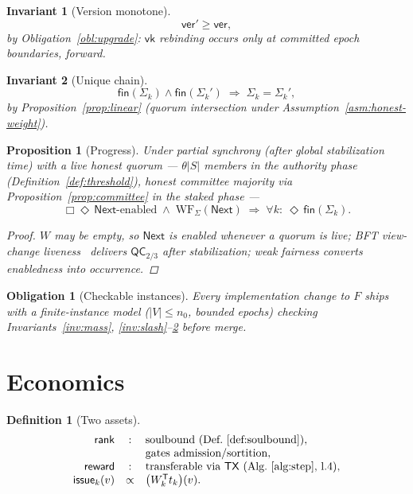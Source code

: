 \documentclass[11pt,letterpaper]{article}
\newtheorem{definition}{Definition}
\newtheorem{invariant}{Invariant}
\newtheorem{proposition}{Proposition}
\newtheorem{obligation}{Obligation}
\begin{document}
\begin{invariant}[Version monotone]\label{inv:version}
\[
\mathsf{ver}'\geq\mathsf{ver},
\]
by Obligation~\ref{obl:upgrade}: $\mathsf{vk}$ rebinding occurs only at
committed epoch boundaries, forward.
\end{invariant}

\begin{invariant}[Unique chain]\label{inv:unique}
\[
\mathsf{fin}(\Sigma_k)\land\mathsf{fin}(\Sigma_k')
\;\Rightarrow\;
\Sigma_k=\Sigma_k',
\]
by Proposition~\ref{prop:linear} (quorum intersection under
Assumption~\ref{asm:honest-weight}).
\end{invariant}

\begin{proposition}[Progress]\label{prop:progress}
Under partial synchrony (after global stabilization time) with a live
honest quorum --- $\theta|S|$ members in the authority phase
(Definition~\ref{def:threshold}), honest committee majority via
Proposition~\ref{prop:committee} in the staked phase ---
\[
\Box\Diamond\,\mathsf{Next}\text{-enabled}
\;\land\;
\mathrm{WF}_{\Sigma}(\mathsf{Next})
\;\Rightarrow\;
\forall k:\ \Diamond\,\mathsf{fin}(\Sigma_k).
\]
\begin{proof}
$W$ may be empty, so $\mathsf{Next}$ is enabled whenever a quorum is
live; BFT view-change liveness~\cite{PBFT} delivers
$\mathsf{QC}_{2/3}$ after stabilization; weak fairness converts
enabledness into occurrence.
\end{proof}
\end{proposition}

\begin{obligation}[Checkable instances]\label{obl:model}
Every implementation change to $F$ ships with a finite-instance model
($|V|\leq n_0$, bounded epochs) checking
Invariants~\ref{inv:mass},
\ref{inv:slash}--\ref{inv:unique} before merge.
\end{obligation}

\section{Economics}\label{sec:economics}

\begin{definition}[Two assets]\label{def:assets}
\[
\begin{array}{rcl}
\mathsf{rank}&:&\text{soulbound (Def.~\ref{def:soulbound})},\\
&&\text{gates admission/sortition},\\
\mathsf{reward}&:&\text{transferable via}\ \mathsf{TX}
  \ \text{(Alg.~\ref{alg:step}, l.4)},\\
\mathsf{issue}_k(v)&\propto&
  \bigl(W_k^{\mathsf T}t_k\bigr)(v).
\end{array}
\]
\end{definition}
\end{document}

